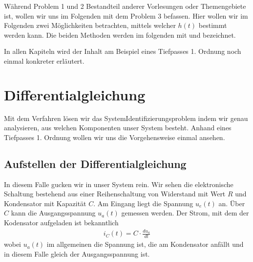 \documentclass[letterpaper,10pt,english]{jupyterBook}
\begin{document}
\sphinxAtStartPar
Während Problem 1 und 2 Bestandteil anderer Vorlesungen oder Themengebiete ist, wollen wir uns im Folgenden mit dem Problem 3 befassen. Hier wollen wir im Folgenden zwei Möglichkeiten betrachten, mittels welcher \(h(t)\) bestimmt werden kann. Die beiden Methoden werden im folgenden mit  und  bezeichnet.

\sphinxAtStartPar
In allen Kapiteln wird der Inhalt am Beispiel eines Tiefpasses 1. Ordnung noch einmal konkreter erläutert.

\sphinxAtStartPar
{}

\sphinxstepscope


\section{Differentialgleichung}
\label{\detokenize{content/5_DGL:differentialgleichung}}\label{\detokenize{content/5_DGL::doc}}
\sphinxAtStartPar
Mit dem \sphinxhyphen{}Verfahren lösen wir das System\sphinxhyphen{}Identifizierungsproblem indem wir genau analysieren, aus welchen Komponenten unser System besteht. Anhand eines Tiefpasses 1. Ordnung wollen wir uns die Vorgehensweise einmal ansehen.


\subsection{Aufstellen der Differentialgleichung}
\label{\detokenize{content/5_DGL:aufstellen-der-differentialgleichung}}
\sphinxAtStartPar

In diesem Falle gucken wir in unser System rein. Wir sehen die elektronische Schaltung bestehend aus einer Reihenschaltung von Widerstand mit Wert \(R\) und Kondensator mit Kapazität \(C\). Am Eingang liegt die Spannung \(u_e(t)\) an. Über \(C\) kann die Ausgangsspannung \(u_a(t)\) gemessen werden. Der Strom, mit dem der Kodensator aufgeladen ist bekanntlich
\begin{equation*}
\begin{split}i_C(t) = C\cdot \frac{du_a}{dt}\end{split}
\end{equation*}
\sphinxAtStartPar
wobei \(u_a(t)\) im allgemeinen die Spannung ist, die am Kondensator anfällt und in diesem Falle gleich der Ausgangsspannung ist.
\end{document}
